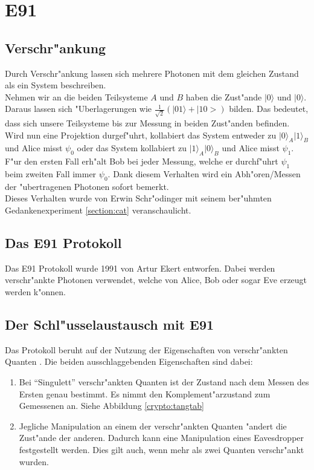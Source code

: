 \newcommand{\qcste}{$-22.5^{\circ}$}
\newcommand{\qcstz}{$0^{\circ}$}
\newcommand{\qcstd}{$22.5^{\circ}$}
\newcommand{\qcstv}{$45^{\circ}$}

\section{E91}
  \subsection{Verschr"ankung}
  Durch Verschr"ankung lassen sich mehrere Photonen mit dem gleichen Zustand als ein System beschreiben.\\
  Nehmen wir an die beiden Teilsysteme $A$ und $B$ haben die Zust"ande $|0\rangle$ und $|0\rangle$. Daraus
  lassen sich "Uberlagerungen wie $\frac{1}{\sqrt{2}}(|01\rangle + |10>)$ bilden. Das bedeutet, dass sich unsere
  Teilsysteme bis zur Messung in beiden Zust"anden befinden.  Wird nun eine
  Projektion durgef"uhrt, kollabiert das System entweder zu $\lvert0\rangle_A|1\rangle_B$ und Alice misst $\psi_0$ oder
  das System kollabiert zu $\lvert1\rangle_A|0\rangle_B$ und Alice misst $\psi_1$. F"ur den ersten Fall erh"alt Bob bei
  jeder Messung, welche er durchf"uhrt $\psi_1$ beim zweiten Fall immer $\psi_0$. Dank diesem Verhalten wird ein
  Abh"oren/Messen der "ubertragenen Photonen sofort bemerkt.\\ Dieses Verhalten wurde von Erwin Schr"odinger mit seinem
  ber"uhmten Gedankenexperiment \ref{section:cat} veranschaulicht.

  \subsection{Das E91 Protokoll}
  Das E91 Protokoll wurde 1991 von Artur Ekert entworfen.
  Dabei werden verschr"ankte Photonen verwendet, welche von Alice, Bob oder sogar Eve erzeugt werden k"onnen.

  \subsection{Der Schl"usselaustausch mit E91}
  Das Protokoll beruht auf der Nutzung der Eigenschaften von verschr"ankten Quanten \cite{qc:verschraenkung}.
  Die beiden ausschlaggebenden Eigenschaften sind dabei:

  \begin{enumerate}
      \item Bei ``Singulett'' verschr"ankten Quanten ist der Zustand nach dem Messen des Ersten genau bestimmt.
        Es nimmt den Komplement"arzustand zum Gemessenen an.
        Siehe Abbildung \ref{crypto:tangtab}
      \item Jegliche Manipulation an einem der verschr"ankten Quanten "andert die Zust"ande der anderen.
        Dadurch kann eine Manipulation eines Eavesdropper festgestellt werden.
        Dies gilt auch, wenn mehr als zwei Quanten verschr"ankt wurden.
  \end{enumerate}

